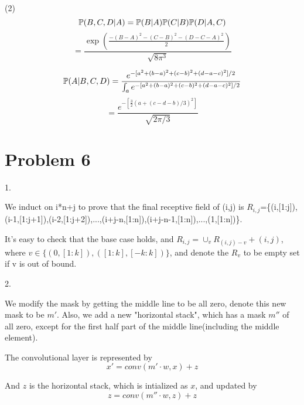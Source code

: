\documentclass[a4 paper,12pt]{article}
\begin{document}
(2)\\
\[\mathbb{P}{(}B,C,D|A) = \mathbb{P}{(}B|A)\mathbb{P}{(}C|B)\mathbb{P}{(}D|A,C)\]
\[= \frac{\exp(\frac{-(B-A)^2-(C-B)^2-(D-C-A)^2}{2})}{\sqrt{8\pi^3}}\]

\[\mathbb{P}{(}A|B,C,D)=\frac{e^{-[a^2+(b-a)^2+(c-b)^2+(d-a-c)^2]/2}}{\int_{a}e^{-[a^2+(b-a)^2+(c-b)^2+(d-a-c)^2]/2}}\]
\[=\frac{e^{-[\frac{3}{2}(a+(c-d-b)/3)^2]}}{\sqrt{2\pi/3}}\]

\section*{Problem 6}
1.

We induct on i*n+j to prove that the final receptive field 
of (i,j) is $R_{i,j}$=\{(i,[1:j]),(i-1,[1:j+1]),(i-2,[1:j+2]),...,(i+j-n,[1:n]),(i+j-n-1,[1:n]),...,(1,[1:n])\}.

It's easy to check that the base case holds, and $R_{i,j} = \cup_{v} R_{(i,j)-v} +(i,j)$,
where $v \in \{(0,[1:k]),([1:k],[-k:k])\}$, and denote the $R_v$ to be empty set if 
v is out of bound.

2.

We modify the mask by getting the middle line to be all zero, denote
this new mask to be $m'$. Also, we add a new "horizontal stack",
which has a mask $m''$ of all zero, except for the first half part
of the middle line(including the middle element).

The convolutional layer is represented by 
\[x'=conv(m'\cdot w, x)+z \]

And $z$ is the horizontal stack, which is intialized as $x$,
and updated by
\[z=conv(m''\cdot w,z)+z \]
\end{document}
